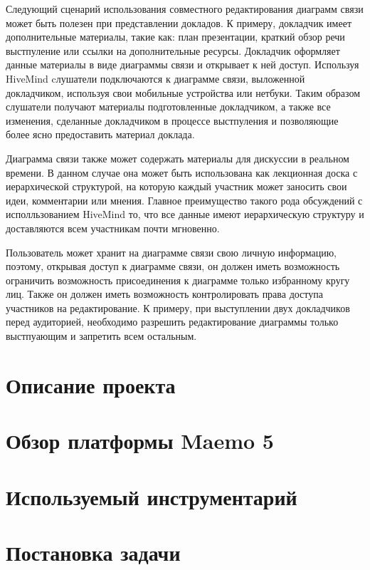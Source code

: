 Следующий сценарий использования совместного редактирования диаграмм связи может
быть полезен при представлении докладов. К примеру, докладчик имеет
дополнительные материалы, такие как: план презентации, краткий обзор речи
выстпуление или ссылки на дополнительные ресурсы. Докладчик оформляет данные
материалы в виде диаграммы связи и открывает к ней доступ. Используя HiveMind
cлушатели подключаются к диаграмме связи, выложенной докладчиком, используя свои
мобильные устройства или нетбуки. Таким образом слушатели получают материалы
подготовленные докладчиком, а также все изменения, сделанные докладчиком в
процессе выстпуления и позволяющие более ясно предоставить материал доклада.

Диаграмма связи также может содержать материалы для дискуссии в реальном
времени. В данном случае она может быть использована как лекционная доска с
иерархической структурой, на которую каждый участник может заносить свои идеи,
комментарии или мнения. Главное преимущество такого рода обсуждений с
исполльзованием HiveMind то, что все данные имеют иерархическую структуру и
доставляются всем участникам почти мгновенно.

Пользователь может хранит на диаграмме связи свою личную информацию, поэтому,
открывая доступ к диаграмме связи, он должен иметь возможность ограничить
возможность присоединения к диаграмме только избранному кругу лиц. Также он
должен иметь возможность контролировать права доступа участников на
редактирование. К примеру, при выступлении двух докладчиков перед аудиторией,
необходимо разрешить редактирование диаграммы только выстпуающим и
запретить всем остальным.

\section{Описание проекта}\label{sec:project_summary}

\section{Обзор платформы Maemo 5}\label{sec:compare_platforms}

\section{Используемый инструментарий}\label{sec:choose_toolkit}

\section{Постановка задачи}\label{sec:statement_task}
